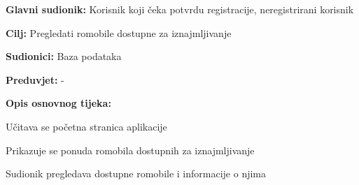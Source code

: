 					
					\noindent {}
					\begin{packed_item}
	
						\item \textbf{Glavni sudionik: }Korisnik koji čeka potvrdu registracije, neregistrirani korisnik
						\item  \textbf{Cilj:} Pregledati romobile dostupne za iznajmljivanje
						\item  \textbf{Sudionici:} Baza podataka
						\item  \textbf{Preduvjet:} -
						\item  \textbf{Opis osnovnog tijeka:}
						
						\item[] \begin{packed_enum}
	
							\item Učitava se početna stranica aplikacije
							\item Prikazuje se ponuda romobila dostupnih za iznajmljivanje
							\item Sudionik pregledava dostupne romobile i informacije o njima
						
						\end{packed_enum}
					\end{packed_item}
						
